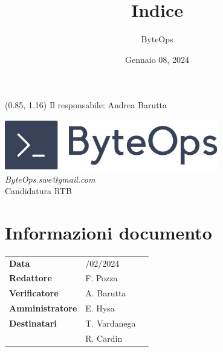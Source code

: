 \documentclass{article}
\title{\textbf{\fontsize{28}{6}\selectfont Indice}}
\author{\fontsize{14}{6}\selectfont ByteOps}
\date{Gennaio 08, 2024}
\begin{document}
\begin{textblock*}{\textwidth}(0.85\textwidth, 1.16\textheight)
    Il responsabile: Andrea Barutta
\end{textblock*}

\pagestyle{fancy}
\begin{center}
\includegraphics[width = 0.7\textwidth]{../Images/logo.png} \\
\vspace{0.2cm}
\textcolor[RGB]{60, 60, 60}{\textit{ByteOps.swe@gmail.com}} \\
\vspace{1cm}
\fontsize{16}{6}\selectfont Candidatura RTB \\
\vspace{0.5cm}
\end{center}

\section*{Informazioni documento}
\def\arraystretch{1.2}
\begin{tabular}{>{\raggedleft\arraybackslash}p{}|>{\raggedright\arraybackslash}p{}c}
\hline
\addlinespace
\textbf{Data} & 08/02/2024 \vspace{10pt} \\
\textbf{Redattore} & F. Pozza \vspace{10pt} \\
\textbf{Verificatore} & A. Barutta \vspace{10pt} \\
\textbf{Amministratore} & E. Hysa \vspace{10pt} \\
\textbf{Destinatari} & T. Vardanega \\ & R. Cardin \vspace{10pt} \\
\end{tabular}
\pagebreak 

\maketitle
\thispagestyle{fancy}
\tableofcontents
{}
\pagebreak
\end{document}
